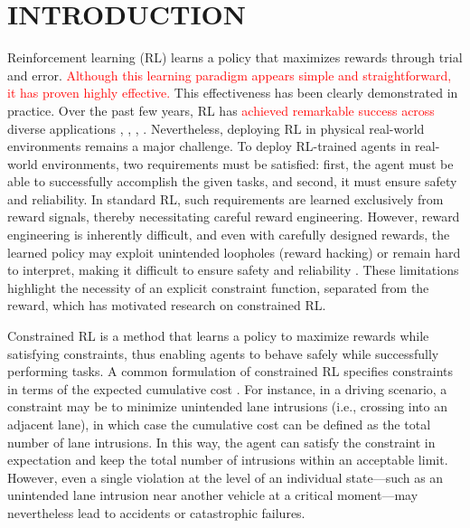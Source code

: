 \section{INTRODUCTION}

Reinforcement learning (RL) learns a policy that maximizes rewards through trial and error.
\textcolor{red}{Although this learning paradigm appears simple and straightforward, it has proven highly effective.}
This effectiveness has been clearly demonstrated in practice.
Over the past few years, RL has \textcolor{red}{achieved remarkable success across} diverse applications \cite{silver2017mastering}, \cite{andrychowicz2020learning}, \cite{schrittwieser2020mastering}, \cite{ouyang2022training}.
Nevertheless, deploying RL in physical real-world environments remains a major challenge.
To deploy RL-trained agents in real-world environments, two requirements must be satisfied:
first, the agent must be able to successfully accomplish the given tasks, and second, it must ensure safety and reliability.
In standard RL, such requirements are learned exclusively from reward signals, thereby necessitating careful reward engineering.
However, reward engineering is inherently difficult, and even with carefully designed rewards, the learned policy may exploit unintended loopholes (reward hacking) or remain hard to interpret, making it difficult to ensure safety and reliability \cite{amodei2016concrete}.  %
These limitations highlight the necessity of an explicit constraint function, separated from the reward, which has motivated research on constrained RL.

Constrained RL is a method that learns a policy to maximize rewards while satisfying constraints, thus enabling agents to behave safely while successfully performing tasks.
A common formulation of constrained RL specifies constraints in terms of the expected cumulative cost \cite{brunke2022safe}.
For instance, in a driving scenario, a constraint may be to minimize unintended lane intrusions (i.e., crossing into an adjacent lane), in which case the cumulative cost can be defined as the total number of lane intrusions.
In this way, the agent can satisfy the constraint in expectation and keep the total number of intrusions within an acceptable limit.
However, even a single violation at the level of an individual state---such as an unintended lane intrusion near another vehicle at a critical moment---may nevertheless lead to accidents or catastrophic failures.

